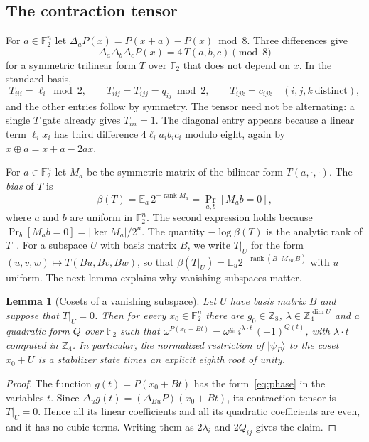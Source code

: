 \documentclass[a4paper,onecolumn,11pt,unpublished]{quantumarticle}
\theoremstyle{plain}
\newtheorem{lemma}[theorem]{Lemma}
\theoremstyle{remark}
\newcommand{\F}{\mathbb{F}_2}
\newcommand{\Z}{\mathbb{Z}}
\newcommand{\ket}[1]{|#1\rangle}
\DeclareMathOperator{\rank}{rank}
\newcommand{\E}{\mathbb{E}}
\newcommand{\T}{\mathsf{T}}
\begin{document}
\subsection{The contraction tensor}

For $a\in\F^n$ let $\Delta_aP(x)=P(x+a)-P(x)\bmod 8$. Three differences give
\begin{equation}\label{eq:third}
\Delta_a\Delta_b\Delta_cP(x)=4\,T(a,b,c)\pmod 8
\end{equation}
for a symmetric trilinear form $T$ over $\F$ that does not depend on $x$. In the standard basis,
\[
T_{iii}=\ell_i\bmod 2,\qquad T_{iij}=T_{ijj}=q_{ij}\bmod 2,\qquad T_{ijk}=c_{ijk}\quad(i,j,k\ \text{distinct}),
\]
and the other entries follow by symmetry. The tensor need not be alternating: a single $T$ gate already gives $T_{iii}=1$. The diagonal entry appears because a linear term $\ell_ix_i$ has third difference $4\ell_ia_ib_ic_i$ modulo eight, again by $x\oplus a=x+a-2ax$.

For $a\in\F^n$ let $M_a$ be the symmetric matrix of the bilinear form $T(a,\cdot,\cdot)$. The \emph{bias} of $T$ is
\begin{equation}\label{eq:bias}
\beta(T)=\E_a\,2^{-\rank M_a}=\Pr_{a,b}\left[M_ab=0\right],
\end{equation}
where $a$ and $b$ are uniform in $\F^n$. The second expression holds because $\Pr_b[M_ab=0]=|\ker M_a|/2^n$. The quantity $-\log\beta(T)$ is the analytic rank of $T$~\cite{Lov19}. For a subspace $U$ with basis matrix $B$, we write $T|_U$ for the form $(u,v,w)\mapsto T(Bu,Bv,Bw)$, so that $\beta(T|_U)=\E_{u}2^{-\rank(B^\T M_{Bu}B)}$ with $u$ uniform. The next lemma explains why vanishing subspaces matter.

\begin{lemma}[Cosets of a vanishing subspace]\label{lem:coset}
Let $U$ have basis matrix $B$ and suppose that $T|_U=0$. Then for every $x_0\in\F^n$ there are $g_0\in\Z_8$, $\lambda\in\Z_4^{\dim U}$ and a quadratic form $Q$ over $\F$ such that $\omega^{P(x_0+Bt)}=\omega^{g_0}\,i^{\lambda\cdot t}\,(-1)^{Q(t)}$, with $\lambda\cdot t$ computed in $\Z_4$. In particular, the normalized restriction of $\ket{\psi_P}$ to the coset $x_0+U$ is a stabilizer state times an explicit eighth root of unity.
\end{lemma}

\begin{proof}
The function $g(t)=P(x_0+Bt)$ has the form~\eqref{eq:phase} in the variables $t$. Since $\Delta_ug(t)=(\Delta_{Bu}P)(x_0+Bt)$, its contraction tensor is $T|_U=0$. Hence all its linear coefficients and all its quadratic coefficients are even, and it has no cubic terms. Writing them as $2\lambda_i$ and $2Q_{ij}$ gives the claim.
\end{proof}
\end{document}
